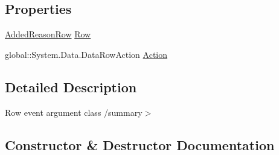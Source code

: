 \subsection*{Properties}
\begin{DoxyCompactItemize}
\item 
\hyperlink{class_env_int_1_1_win32_1_1_field_tech_1_1_manager_1_1_data_sets_1_1_guide_ware_mobile_data_set_1_1_added_reason_row}{Added\+Reason\+Row} \hyperlink{class_env_int_1_1_win32_1_1_field_tech_1_1_manager_1_1_data_sets_1_1_guide_ware_mobile_data_set_03c6c2b8486bc739eb1146c140ad3745_a6d1a3c3146de5d26d08934a3509a5df2}{Row}
\item 
global\+::\+System.\+Data.\+Data\+Row\+Action \hyperlink{class_env_int_1_1_win32_1_1_field_tech_1_1_manager_1_1_data_sets_1_1_guide_ware_mobile_data_set_03c6c2b8486bc739eb1146c140ad3745_aeba0ddcbbcc63287e39e23e46e3983e5}{Action}
\end{DoxyCompactItemize}


\subsection{Detailed Description}
Row event argument class /summary$>$ 

\subsection{Constructor \& Destructor Documentation}
\hypertarget{class_env_int_1_1_win32_1_1_field_tech_1_1_manager_1_1_data_sets_1_1_guide_ware_mobile_data_set_03c6c2b8486bc739eb1146c140ad3745_aa53f77b5ea86b79fedb970f33a1909f9}{}

